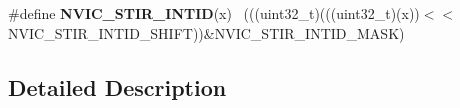 \begin{DoxyCompactItemize}
\item 
\hypertarget{group___n_v_i_c___register___masks_ga2e9d5720e792c7bb0e0119e35b7ab415}{}\#define {\bfseries N\+V\+I\+C\+\_\+\+S\+T\+I\+R\+\_\+\+I\+N\+T\+I\+D}(x)                                          ~(((uint32\+\_\+t)(((uint32\+\_\+t)(x))$<$$<$N\+V\+I\+C\+\_\+\+S\+T\+I\+R\+\_\+\+I\+N\+T\+I\+D\+\_\+\+S\+H\+I\+F\+T))\&N\+V\+I\+C\+\_\+\+S\+T\+I\+R\+\_\+\+I\+N\+T\+I\+D\+\_\+\+M\+A\+S\+K)\label{group___n_v_i_c___register___masks_ga2e9d5720e792c7bb0e0119e35b7ab415}

\end{DoxyCompactItemize}


\subsection{Detailed Description}
